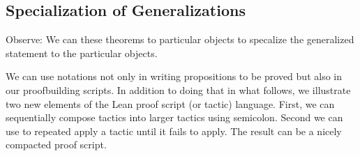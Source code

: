 \documentclass[letterpaper,10pt,english]{sphinxmanual}
\begin{document}
\subsection{Specialization of Generalizations}
\label{\detokenize{A_01_Propositional_Logic:specialization-of-generalizations}}
\sphinxAtStartPar
Observe: We can  these theorems
to particular objects to specalize the
generalized statement to the particular
objects.

\begin{sphinxVerbatim}[commandchars=\\\{\}]
    
\end{sphinxVerbatim}

\sphinxAtStartPar
We can use notations not only in writing
propositions to be proved but also in our
proof\sphinxhyphen{}building scripts. In addition to doing
that in what follows, we illustrate two new
elements of the Lean proof script (or tactic)
language. First, we can sequentially compose
tactics into larger tactics using semi\sphinxhyphen{}colon.
Second we can use  to repeated apply a
tactic until it fails to apply. The result
can be a nicely compacted proof script.

\begin{sphinxVerbatim}[commandchars=\\\{\}]
      
   
    
            
\end{sphinxVerbatim}
\end{document}
